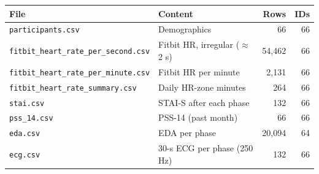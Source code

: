 \begin{tabular}{@{}llrr@{}}
\toprule
File & Content & Rows & IDs \\
\midrule
\texttt{participants.csv} & Demographics & 66 & 66 \\
\texttt{fitbit\_heart\_rate\_per\_second.csv} & Fitbit HR, irregular ($\approx$2 s) & 54,462 & 66 \\
\texttt{fitbit\_heart\_rate\_per\_minute.csv} & Fitbit HR per minute & 2,131 & 66 \\
\texttt{fitbit\_heart\_rate\_summary.csv} & Daily HR-zone minutes & 264 & 66 \\
\texttt{stai.csv} & STAI-S after each phase & 132 & 66 \\
\texttt{pss\_14.csv} & PSS-14 (past month) & 66 & 66 \\
\texttt{eda.csv} & EDA per phase & 20,094 & 64 \\
\texttt{ecg.csv} & 30-s ECG per phase (250 Hz) & 132 & 66 \\
\bottomrule
\end{tabular}
